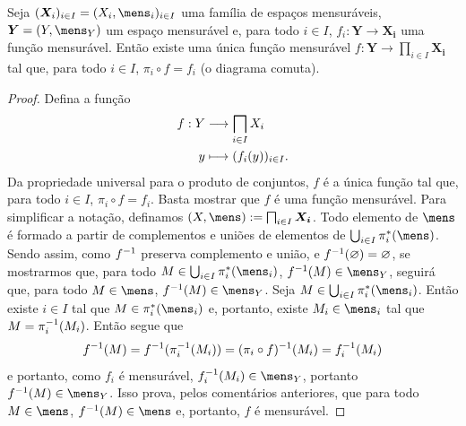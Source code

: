 \begin{prop}
Seja $(\bm X_i)_{i \in I} = (X_i,\mens_i)_{i \in I}$ uma família de espaços mensuráveis, $\bm Y = (Y,\mens_Y)$ um espaço mensurável e, para todo $i \in I$, $f_i: \bm Y \to \bm{X_i}$ uma função mensurável. Então existe uma única função mensurável $f: \bm Y \to \prod_{i \in I} \bm{X_i}$ tal que, para todo $i \in I$, $\pi_i \circ f = f_i$ (o diagrama comuta).
\begin{figure}
\centering
{}
\end{figure}
\end{prop}
\begin{proof}
Defina a função
	\begin{align*}
	\func{f}{Y}{\prod_{i \in I} X_i}{y}{(f_i(y))_{i \in I}}.
	\end{align*}
Da propriedade universal para o produto de conjuntos, $f$ é a única função tal que, para todo $i \in I$, $\pi_i \circ f = f_i$. Basta mostrar que $f$ é uma função mensurável. Para simplificar a notação, definamos $(X,\mens) := \prod_{i \in I} \bm{X_i}$. Todo elemento de $\mens$ é formado a partir de complementos e uniões de elementos de $\bigcup_{i \in I} \pi_i^*(\mens)$. Sendo assim, como $f^{-1}$ preserva complemento e união, e $f^{-1}(\varnothing)=\varnothing$, se mostrarmos que, para todo $M \in \bigcup_{i \in I} \pi_i^*(\mens_i)$, $f\inv(M) \in \mens_Y$, seguirá que, para todo $M \in \mens$, $f\inv(M) \in \mens_Y$. Seja $M \in \bigcup_{i \in I} \pi_i^*(\mens_i)$. Então existe $i \in I$ tal que $M \in \pi_i^*(\mens_i)$ e, portanto, existe $M_i \in \mens_i$ tal que $M=\pi_i^{-1}(M_i)$. Então segue que
	\begin{equation*}
	f^{-1}(M) = f^{-1}(\pi_i^{-1}(M_i)) = (\pi_i \circ f)^{-1}(M_i) = f_i^{-1}(M_i)
	\end{equation*}
e portanto, como $f_i$ é mensurável, $f_i\inv(M_i) \in \mens_Y$, portanto $f\inv(M) \in \mens_Y$. Isso prova, pelos comentários anteriores, que para todo $M \in \mens$, $f\inv(M) \in \mens$ e, portanto, $f$ é mensurável.
\end{proof}









